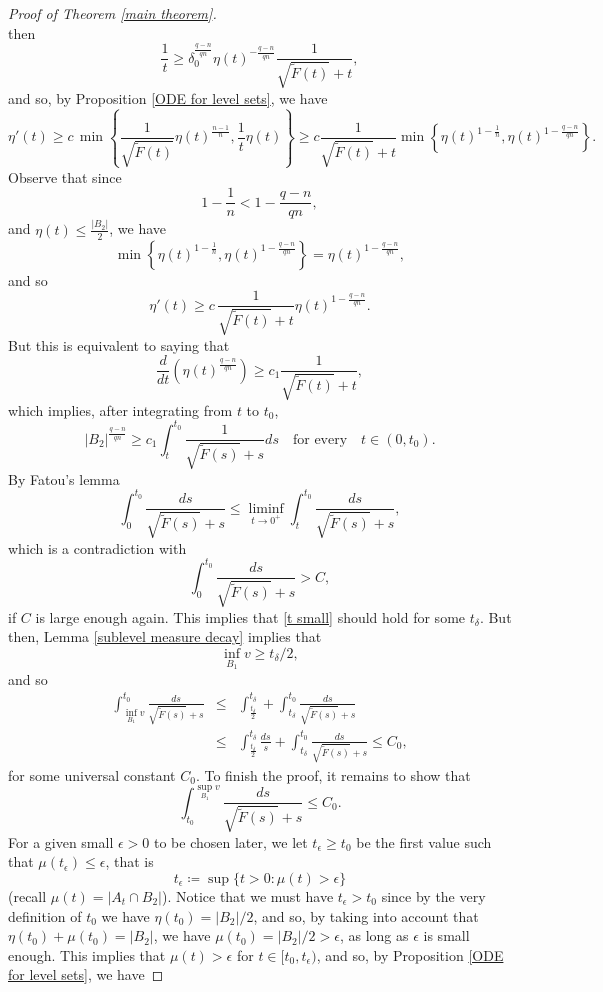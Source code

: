 \documentclass[12pt,a4paper]{amsart}
\numberwithin{equation}{section} %
\theoremstyle{definition}
\theoremstyle{remark}
\begin{document}
\begin{proof}[Proof of Theorem \ref{main theorem}]
$$$$
then
$$
    \frac{1}{t} \geq \delta_0^{\frac{q-n}{q n}}\eta(t)^{-\frac{q-n}{q n}}\frac{1}{\sqrt{\tilde{F}(t)}+t},
$$
and so, by Proposition \ref{ODE for level sets}, we have
$$
    \eta'(t) \geq c\, \min\left\{\frac{1}{\sqrt{\tilde{F}(t)}}\eta(t)^{\frac{n-1}{n}}, \frac{1}{t}\eta(t) \right\} \geq c\frac{1}{\sqrt{\tilde{F}(t)}+t}\min\left\{\eta(t)^{1 - \frac{1}{n}}, \eta(t)^{1-\frac{q-n}{q n}} \right\}.
$$
Observe that since
$$
    1 - \frac{1}{n} < 1 - \frac{q-n}{q n},
$$
and $\eta(t) \leq \frac{|B_2|}{2}$, we have 
$$
    \min\left\{\eta(t)^{1 - \frac{1}{n}}, \eta(t)^{1-\frac{q-n}{q n}} \right\} = \eta(t)^{1-\frac{q-n}{q n}},
$$
and so
$$
    \eta'(t) \geq c\, \frac{1}{\sqrt{\tilde{F}(t)}+t} \eta(t)^{1-\frac{q-n}{q n}}.
$$
But this is equivalent to saying that
$$
    \frac{d}{dt}\left(\eta(t)^{\frac{q-n}{q n}} \right) \geq c_1 \frac{1}{\sqrt{\tilde{F}(t)}+t},
$$
which implies, after integrating from $t$ to $t_0$,
$$
   |B_2|^{\frac{q-n}{q n}} \geq c_1 \int_{t}^{t_0}\frac{1}{\sqrt{\tilde{F}(s)}+s}ds \quad \mbox{for every} \quad t \in (0,t_0).
$$
By Fatou's lemma
$$
    \int_{0}^{t_0} \frac{ds}  {\sqrt{\tilde{F}(s)}+s} \leq \liminf_{t \to 0^+} \int_{t}^{t_0} \frac{ds}{\sqrt{\tilde{F}(s)}+s},
$$
which is a contradiction with
$$
    \int_{0}^{t_0}\frac{ds}{\sqrt{\tilde{F}(s)}+s} > C,
$$
if $C$ is large enough again. This implies that \eqref{t small} should hold for some $t_\delta$. But then, Lemma \ref{sublevel measure decay} implies that
$$
    \inf_{B_1} v \geq t_\delta/2,
$$
and so
\begin{eqnarray*}
    \int_{\inf_{B_1}v}^{t_0}\frac{ds}{\sqrt{\tilde{F}(s)}+s} &\leq& \int_{\frac{t_\delta}{2}}^{t_\delta} + \int_{t_\delta}^{t_0}\frac{ds}{\sqrt{\tilde{F}(s)}+s}\\
    & \leq & \int_{\frac{t_\delta}{2}}^{t_\delta} \frac{ds}{s} + \int_{t_\delta}^{t_0}\frac{ds}{\sqrt{\tilde{F}(s)}+s} \leq C_0,
\end{eqnarray*}
for some universal constant $C_0$. To finish the proof, it remains to show that
$$
    \int_{t_0}^{\sup_{B_1}v}\frac{ds}{\sqrt{\tilde{F}(s)}+s} \leq C_0.
$$
For a given small $\epsilon>0$ to be chosen later, we let $t_\epsilon \geq t_0$ be the first value such that $\mu(t_\epsilon) \leq \epsilon$, that is
$$
    t_\epsilon \coloneqq \sup\{t>0 \colon \mu(t)>\epsilon \}
$$
(recall $\mu(t) = |A_t \cap B_2|$). Notice that we must have $t_\epsilon > t_0$ since by the very definition of $t_0$ we have $\eta(t_0) = |B_2|/2$, and so, by taking into account that $\eta(t_0) + \mu(t_0) = |B_2|$, we have $\mu(t_0) = |B_2|/2 > \epsilon$, as long as $\epsilon$ is small enough. This implies that $\mu(t) > \epsilon$ for $t \in [t_0,t_\epsilon)$, and so, by Proposition \ref{ODE for level sets}, we have

\end{proof}
\end{document}
